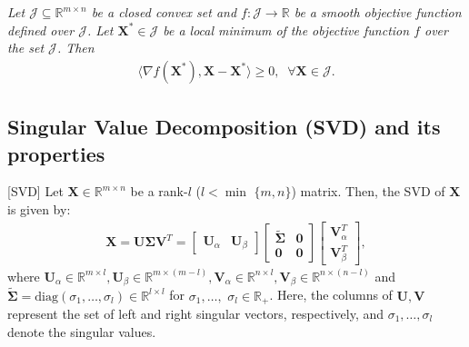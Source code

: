 \documentclass[twocolumn]{svjour3}
\newcommand{\signal}{\boldsymbol{X}}
\newcommand{\dimension}{m \times n}
\begin{document}
\begin{lemma}{\label{lemma:5}}\cite{Bertsekas} \textit{Let $ \mathcal{J} \subseteq \mathbb{R}^{\dimension} $ be a closed convex set and $ f: \mathcal{J} \rightarrow \mathbb{R} $ be a smooth objective function defined over $ \mathcal{J} $. Let $ \signal^\ast \in \mathcal{J} $ be a local minimum of the objective function $ f $ over the set $ \mathcal{J} $. Then}
\begin{align}
\langle \nabla f(\signal^\ast), \signal - \signal^\ast \rangle \geq 0, \;\; \forall \signal \in \mathcal{J}.
\end{align}
\end{lemma}

\subsection{Singular Value Decomposition (SVD) and its properties}

\begin{definition}{\label{def:svd}}[SVD]
Let $ \signal \in \mathbb{R}^{\dimension} $ be a rank-$ l $ ($ l < \min $ $\lbrace m, n \rbrace $) matrix. Then, the SVD of $ \signal $ is given by:
\begin{align}
\signal = \boldsymbol{U} \boldsymbol{\Sigma} \boldsymbol{V}^{T} = \begin{bmatrix} \boldsymbol{U}_{\alpha} & \boldsymbol{U}_{\beta} \end{bmatrix} \begin{bmatrix} \widetilde{\boldsymbol{\Sigma}} & \boldsymbol{0} \\ \boldsymbol{0} & \boldsymbol{0} \end{bmatrix} \begin{bmatrix} \boldsymbol{V}_{\alpha}^{T} \\ \boldsymbol{V}_{\beta}^T \end{bmatrix}, \label{prel:eq:00}
\end{align} where $ \boldsymbol{U}_{\alpha} \in \mathbb{R}^{m \times l}, \boldsymbol{U}_{\beta} \in \mathbb{R}^{m \times (m - l)}, \boldsymbol{V}_{\alpha} \in \mathbb{R}^{n \times l}, \boldsymbol{V}_{\beta} \in \mathbb{R}^{n \times (n - l)} $ and $ \widetilde{\boldsymbol{\Sigma}} = \text{diag}(\sigma_1, \dots, \sigma_l) \in \mathbb{R}^{l \times l} $ for $ \sigma_1, \dots, $ $\sigma_l \in \mathbb{R}_{+} $. Here, the columns of $ \boldsymbol{U}, \boldsymbol{V} $ represent the set of left and right singular vectors, respectively, and $ \sigma_1, \dots, \sigma_l $ denote the singular values.
\end{definition}
\end{document}
